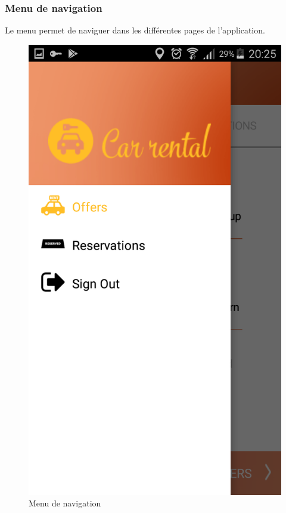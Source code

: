 \documentclass[12pt,a4paper]{report}
\begin{document}
	\subsubsection{Menu de navigation}
Le menu permet de naviguer dans les différentes pages de l'application.
	\vspace{2cm}
	\begin{figure}[!hbtp]
		\centering
		\includegraphics[scale=0.2]{./graphics/Menu.png}
		\caption{Menu de navigation}
		\end{figure}
		\newpage
\end{document}
